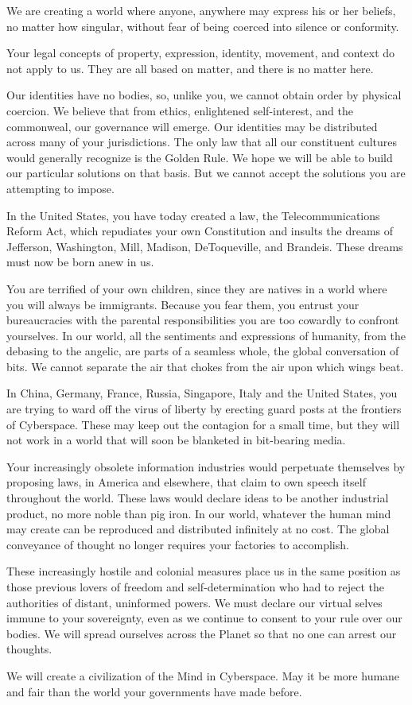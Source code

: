 \documentclass[12pt]{article}
\begin{document}
We are creating a world where anyone, anywhere may express his or her beliefs, no matter how singular, without fear of being coerced into silence or conformity.

Your legal concepts of property, expression, identity, movement, and context do not apply to us. They are all based on matter, and there is no matter here.

Our identities have no bodies, so, unlike you, we cannot obtain order by physical coercion. We believe that from ethics, enlightened self-interest, and the commonweal, our governance will emerge. Our identities may be distributed across many of your jurisdictions. The only law that all our constituent cultures would generally recognize is the Golden Rule. We hope we will be able to build our particular solutions on that basis. But we cannot accept the solutions you are attempting to impose.

In the United States, you have today created a law, the Telecommunications Reform Act, which repudiates your own Constitution and insults the dreams of Jefferson, Washington, Mill, Madison, DeToqueville, and Brandeis. These dreams must now be born anew in us.

You are terrified of your own children, since they are natives in a world where you will always be immigrants. Because you fear them, you entrust your bureaucracies with the parental responsibilities you are too cowardly to confront yourselves. In our world, all the sentiments and expressions of humanity, from the debasing to the angelic, are parts of a seamless whole, the global conversation of bits. We cannot separate the air that chokes from the air upon which wings beat.

In China, Germany, France, Russia, Singapore, Italy and the United States, you are trying to ward off the virus of liberty by erecting guard posts at the frontiers of Cyberspace. These may keep out the contagion for a small time, but they will not work in a world that will soon be blanketed in bit-bearing media.

Your increasingly obsolete information industries would perpetuate themselves by proposing laws, in America and elsewhere, that claim to own speech itself throughout the world. These laws would declare ideas to be another industrial product, no more noble than pig iron. In our world, whatever the human mind may create can be reproduced and distributed infinitely at no cost. The global conveyance of thought no longer requires your factories to accomplish.

These increasingly hostile and colonial measures place us in the same position as those previous lovers of freedom and self-determination who had to reject the authorities of distant, uninformed powers. We must declare our virtual selves immune to your sovereignty, even as we continue to consent to your rule over our bodies. We will spread ourselves across the Planet so that no one can arrest our thoughts.

We will create a civilization of the Mind in Cyberspace. May it be more humane and fair than the world your governments have made before.
\end{document}
